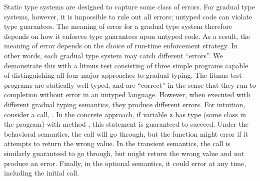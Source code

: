 \documentclass[USenglish]{tex/lipics-v2016}
\newcommand{\code}[1]{{\tt #1}\xspace}
\begin{document}
Static type systems are designed to capture some class of errors. For
gradual type systems, however, it is impossible to rule out all errors;
untyped code can violate type guarantees. The meaning of error for a gradual
type system therefore depends on how it enforces type guarantees upon untyped
code. As a result, the meaning of error depends on the choice of run-time
enforcement strategy. In other words, each gradual type system may catch
different ``errors''.  We demonstrate this with a litmus test consisting of
three simple programs capable of distinguishing all four major approaches to
gradual typing. The litmus test programs are statically well-typed, and are
``correct'' in the sense that they run to completion without error in an
untyped language. However, when executed with different gradual typing
semantics, they produce different errors. For intuition,
consider a call, . In the concrete approach, if variable \code x
has type \C (some class in the program) with method \m, this statement is guaranteed to
succeed. Under the behavioral semantics, the call will go through, but the function
might error if it attempts to return the wrong value. In the transient semantics, the call is similarly
guaranteed to go through, but might return the wrong value and not produce an error.
Finally, in the optional semantics, it could error at any time, including the initial
call.
\end{document}
